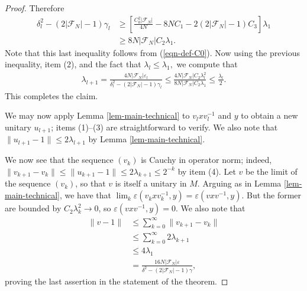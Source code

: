 \documentclass[10pt]{amsart}
\numberwithin{equation}{section}
\theoremstyle{definition}
\newcommand{\cF}{\mathcal{F}}
\newcommand{\ee}{\varepsilon}
\begin{document}
\begin{proof}
    Therefore 
    \begin{align*}
        \delta_l^2 - (2|\cF_N|-1)\gamma_l &\ge \left[\frac{C_0^2|\cF_N|}{4N} - 8NC_1 - 2(2|\cF_N|-1)C_3\right]\lambda_1 \\
        &\ge 8N|\cF_N|C_2 \lambda_1.
    \end{align*}
        Note that this last inequality follows from (\ref{eqn-def-C0}).
    Now using the previous inequality, item (2), and the fact that $\lambda_l\le \lambda_1,$ we compute that
    \begin{align*}
        \lambda_{l+1} = \frac{4N|\cF_N|\ee_l}{\delta^2_l - (2|\cF_N|-1)\gamma_l} \le \frac{4N|\cF_N|C_2\lambda_l^2}{8N|\cF_N|C_2 \lambda_1} \le \frac{\lambda_l}{2}.
    \end{align*}
    This completes the claim. 

    We may now apply Lemma \ref{lem-main-technical} to $v_lxv_l^{-1}$ and $y$ to obtain a new unitary $u_{l+1}$; items (1)--(3) are straightforward to verify. We also note that $\|u_{l+1} - 1\| \le 2\lambda_{l+1}$ by Lemma \ref{lem-main-technical}.

    We now see that the sequence $(v_k)$ is Cauchy in operator norm; indeed, $\|v_{k+1} - v_k\| \le \|u_{k+1}-1\| \le 2\lambda_{k+1} \le 2^{-k}$ by item (4). Let $v$ be the limit of the sequence $(v_k)$, so that $v$ is itself a unitary in $M$. Arguing as in Lemma \ref{lem-main-technical}, we have that $\lim_k \ee(v_kxv_k^{-1},y)= \ee(vxv^{-1},y)$. But the former are bounded by $C_2\lambda_k^2 \to 0$, so $\ee(vxv^{-1},y) = 0.$ We also note that 
    \begin{align*}
        \|v-1\| &\le \sum_{k=0}^\infty \|v_{k+1}-v_k\| \\
        &\le \sum_{k=0}^\infty 2\lambda_{k+1}\\
        &\le 4\lambda_1 \\
        &= \frac{16N|\cF_N|\ee}{\delta^2 - (2|\cF_N|-1)\gamma}, 
    \end{align*}
    proving the last assertion in the statement of the theorem.
\end{proof}
\end{document}
